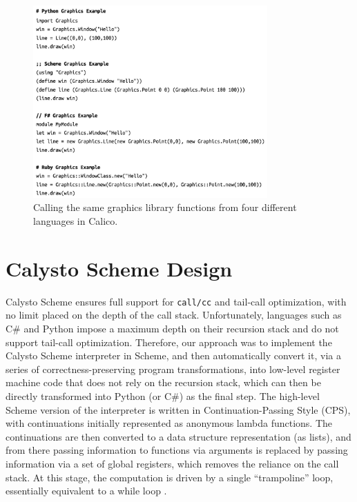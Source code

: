 \documentclass[acmsmall,screen,authorversion]{acmart}
\begin{document}

\begin{figure}
  \includegraphics[width=0.8\textwidth]{graphics-scripts.jpg}
  \caption{Calling the same graphics library functions from four different languages in Calico.}
  \label{fig:scripts}
  \Description{}
\end{figure}


\section{Calysto Scheme Design}

Calysto Scheme ensures full support for \texttt{call/cc} and tail-call
optimization, with no limit placed on the depth of the call stack.
Unfortunately, languages such as C\# and Python impose a maximum depth on their
recursion stack and do not support tail-call optimization.  Therefore, our
approach was to implement the Calysto Scheme interpreter in Scheme, and then
automatically convert it, via a series of correctness-preserving program
transformations, into low-level register machine code that does not rely on the
recursion stack, which can then be directly transformed into Python (or C\#) as
the final step.  The high-level Scheme version of the interpreter is written in
Continuation-Passing Style (CPS), with continuations initially represented as
anonymous lambda functions.  The continuations are then converted to a data
structure representation (as lists), and from there passing information to
functions via arguments is replaced by passing information via a set of global
registers, which removes the reliance on the call stack.  At this stage, the
computation is driven by a single ``trampoline'' loop, essentially equivalent
to a while loop \cite{Ganz99, EOPL3}.
\end{document}
